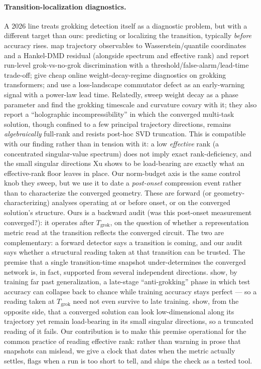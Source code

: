 \documentclass[11pt]{article}
\begin{document}
\paragraph{Transition-localization diagnostics.} A 2026 line treats grokking detection itself as a
diagnostic problem, but with a different target than ours: predicting or localizing the transition,
typically \emph{before} accuracy rises. \citet{wang2026spectral} map trajectory observables to
Wasserstein/quantile coordinates and a Hankel-DMD residual (alongside spectrum and effective rank) and
report run-level grok-vs-no-grok discrimination with a threshold/false-alarm/lead-time trade-off;
\citet{verma2026weightdecay} give cheap online weight-decay-regime diagnostics on grokking transformers;
and \citet{xu2026earlywarning} use a loss-landscape commutator defect as an early-warning signal with a
power-law lead time. Relatedly, \citet{xu2026multitask} sweep weight decay as a phase parameter and find
the grokking timescale and curvature covary with it; they also report a ``holographic incompressibility''
in which the converged multi-task solution, though confined to a few principal trajectory directions,
remains \emph{algebraically} full-rank and resists post-hoc SVD truncation. This is compatible with our
finding rather than in tension with it: a low \emph{effective} rank (a concentrated singular-value
spectrum) does not imply exact rank-deficiency, and the small singular directions Xu shows to be
load-bearing are exactly what an effective-rank floor leaves in place. Our norm-budget axis is the same
control knob they sweep, but we use it to date a \emph{post-onset} compression event rather than to
characterize the converged geometry. These are
forward (or geometry-characterizing) analyses operating at or before onset, or on the converged
solution's structure. Ours is a backward audit (was this post-onset measurement converged?): it
operates after
$T_{\mathrm{grok}}$, on the question of whether a representation metric read at the transition reflects
the converged circuit. The two are complementary: a forward detector says a transition is coming, and our
audit says whether a structural reading taken at that transition can be trusted. The premise that a
single transition-time snapshot under-determines the converged network is, in fact, supported from
several independent directions. \citet{prakash2026antigrokking} show, by training far past
generalization, a late-stage ``anti-grokking'' phase in which test accuracy can collapse back to chance
while training accuracy stays perfect --- so a reading taken at $T_{\mathrm{grok}}$ need not even survive
to late training. \citet{xu2026multitask} show, from the opposite side, that a converged solution can
look low-dimensional along its trajectory yet remain load-bearing in its small singular directions, so a
truncated reading of it fails. Our contribution is to make this premise operational for the
common practice of reading effective rank: rather than warning in prose that snapshots can mislead, we
give a clock that dates when the metric actually settles, flags when a run is too short to tell, and
ships the check as a tested tool.
\end{document}

